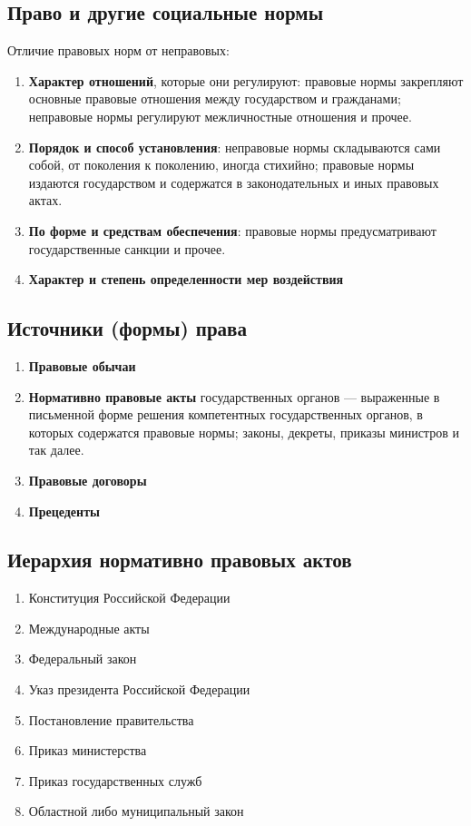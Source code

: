 \documentclass{article}
\begin{document}
\subsection{Право и другие социальные нормы}

Отличие правовых норм от неправовых:

\begin{enumerate}
    \item \textbf{Характер отношений}, которые они регулируют: правовые нормы закрепляют основные правовые отношения между государством и гражданами; неправовые нормы регулируют межличностные отношения и прочее.
    \item \textbf{Порядок и способ установления}: неправовые нормы складываются сами собой, от поколения к поколению, иногда стихийно; правовые нормы издаются государством и содержатся в законодательных и иных правовых актах.
    \item \textbf{По форме и средствам обеспечения}: правовые нормы предусматривают государственные санкции и прочее.
    \item \textbf{Характер и степень определенности мер воздействия}
\end{enumerate}

\subsection{Источники (формы) права}

\begin{enumerate}
    \item \textbf{Правовые обычаи}
    \item \textbf{Нормативно правовые акты} государственных органов — выраженные в письменной форме решения компетентных государственных органов, в которых содержатся правовые нормы; законы, декреты, приказы министров и так далее.
    \item \textbf{Правовые договоры}
    \item \textbf{Прецеденты}
\end{enumerate}

\subsection{Иерархия нормативно правовых актов}

\begin{enumerate}
    \item Конституция Российской Федерации
    \item Международные акты
    \item Федеральный закон
    \item Указ президента Российской Федерации
    \item Постановление правительства
    \item Приказ министерства
    \item Приказ государственных служб
    \item Областной либо муниципальный закон
\end{enumerate}
\end{document}
